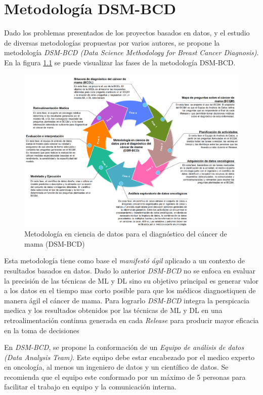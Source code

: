 \chapter{Metodología DSM-BCD}

Dado los problemas presentados de los proyectos basados en datos, y el estudio de diversas metodologías propuestas por varios autores, se propone la metodología \textit{DSM-BCD (Data Science Methodology for Breast Cancer Diagnosis)}. En la figura \ref{DSM-BCD} se puede visualizar las fases de la metodología DSM-BCD.

\begin{figure}[!htb]
	\centering
	\includegraphics[width=0.9
	\linewidth]{IMAGENES/DSM-BCD_SPANISH.pdf}
	\caption{Metodología en ciencia de datos para el diagnóstico del cáncer de mama 
		(DSM-BCD)}
	\label{DSM-BCD}
\end{figure}

Esta metodología tiene como base el \textit{manifestó ágil} aplicado a un contexto de resultados basados en datos. Dado lo anterior \textit{DSM-BCD} no se enfoca en evaluar la precisión de las técnicas de ML y DL sino su objetivo principal es generar valor a los datos en el tiempo mas corto posible para que los médicos diagnostiquen de manera ágil el cáncer de mama. Para lograrlo \textit{DSM-BCD} integra la perspicacia medica y los resultados obtenidos por las técnicas de ML y DL en una retroalimentación continua generada en cada \textit{Release} para producir mayor eficacia en la toma de decisiones

 En \textit{DSM-BCD}, se propone la conformación de un \textit{Equipo de análisis de datos (Data Analysis Team)}. Este equipo debe estar encabezado por el medico experto en oncología, al menos un ingeniero de datos y un científico de datos. Se recomienda que el equipo este conformado por un máximo de 5 personas para facilitar el trabajo en equipo y la comunicación interna.
 

